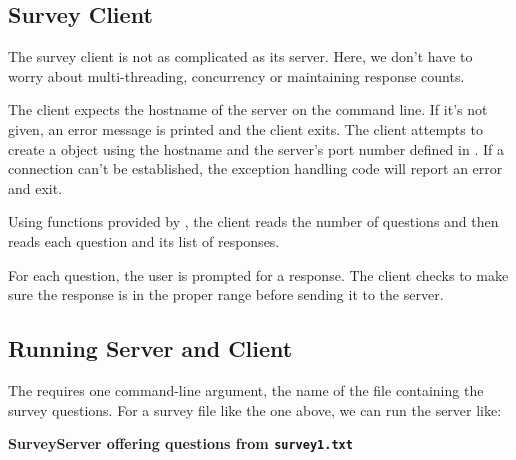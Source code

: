 \subsection{Survey Client}

The survey client is not as complicated as its server.  Here, we
don't have to worry about multi-threading, concurrency or maintaining
response counts.  


\begin{topcode}



The client expects the hostname of the server on the command line.  If
it's not given, an error message is printed and the client exits.  The
client attempts to create a  object using the hostname
and the server's port number defined in .  If a
connection can't be established, the exception handling code will
report an error and exit.


Using functions provided by , the client reads
the number of questions and then reads each question and its list of
responses.


For each question, the user is prompted for a response.
The client checks to make sure the response is in the proper range
before sending it to the server.

\end{topcode}

\subsection{Running Server and Client}

The  requires one command-line argument, the name
of the file containing the survey questions.  For a survey file like
the one above, we can run the server like:

\noindent \textbf{SurveyServer offering questions from \texttt{survey1.txt}}
\begin{shell}
\prompt {} \\
\end{shell}

